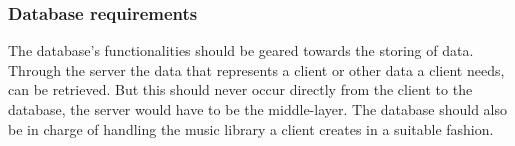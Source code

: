 \subsubsection{Database requirements}


The database's functionalities should be geared towards the storing of data. Through the server the data that represents a client or other data a client needs, can be retrieved. But this should never occur directly from the client to the database, the server would have to be the middle-layer. The database should also be in charge of handling the music library a client creates in a suitable fashion.